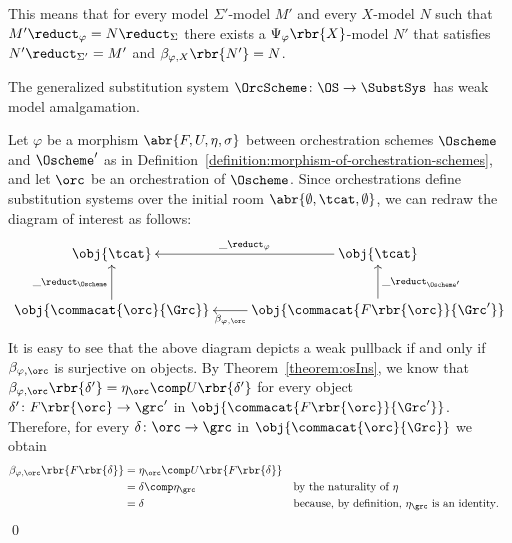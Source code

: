 \documentclass{LMCS}
\begin{document}
  \noindent This means that for every model \(\Sigma'\)\nb-model \(M'\) and every \(X\)\nb-model \(N\) such that \(M' \reduct_{\varphi} = N \reduct_{\Sigma}\) there exists a \(\Psi_{\varphi}\rbr{X}\)\nb-model \(N'\) that satisfies \(N' \reduct_{\Sigma'} = M'\) and \(\beta_{\varphi, X}\rbr{N'} = N\).

  \begin{prop}
    \label{proposition:weak-model-amalgamation-in-OrcScheme}
    The generalized substitution system \(\OrcScheme \colon \OS \to \SubstSys\) has weak model amalgamation.
  \end{prop}

  \proof
  Let \(\varphi\) be a morphism \(\abr{F, U, \eta, \sigma}\) between orchestration schemes \(\Oscheme\) and \(\Oscheme'\) as in Definition~\ref{definition:morphism-of-orchestration-schemes}, and let \(\orc\) be an orchestration of \(\Oscheme\).
  Since orchestrations define substitution systems over the initial room \(\abr{\emptyset, \tcat, \emptyset}\), we can redraw the diagram of interest as follows:
  \[
  \xymatrix {
    {\obj{\tcat}}
    & {\obj{\tcat}}
    \ar [l] _-{\_ \reduct_{\varphi}}
    \\
    {\obj{\commacat{\orc}{\Grc}}}
    \ar [u] ^{\_ \reduct_{\Oscheme}}
    & {\obj{\commacat{F\rbr{\orc}}{\Grc'}}}
    \ar [u] _{\_ \reduct_{\Oscheme'}}
    \ar [l] ^-{\beta_{\varphi, \orc}}
  }
  \]
  It is easy to see that the above diagram depicts a weak pullback if and only if \(\beta_{\varphi, \orc}\) is surjective on objects.
  By Theorem~\ref{theorem:osIns}, we know that \(\beta_{\varphi, \orc}\rbr{\delta'} = \eta_{\orc} \comp U\rbr{\delta'}\) for every object \(\delta' \colon F\rbr{\orc} \to \grc'\) in \(\obj{\commacat{F\rbr{\orc}}{\Grc'}}\).
  Therefore, for every \(\delta \colon \orc \to \grc\) in \(\obj{\commacat{\orc}{\Grc}}\) we obtain 
  \begin{align*}
    \beta_{\varphi, \orc}\rbr{F\rbr{\delta}} & = \eta_{\orc} \comp U\rbr{F\rbr{\delta}} \\
                                             & = \delta \comp \eta_{\grc}
                                             && \text{by the naturality of \(\eta\)} \\
                                             & = \delta
                                             && \text{because, by definition, \(\eta_{\grc}\) is an identity}.
\end{align*}
  \qed
\end{document}
